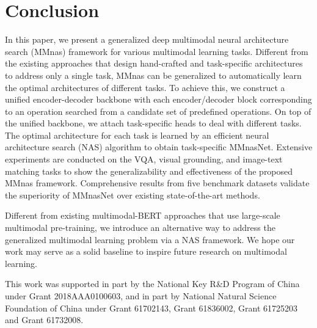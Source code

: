 \documentclass[sigconf]{acmart}
\begin{document}
\section{Conclusion}
In this paper, we present a generalized deep multimodal neural architecture search (MMnas) framework for various multimodal learning tasks. Different from the existing approaches that design hand-crafted and task-specific architectures to address only a single task, MMnas can be generalized to automatically learn the optimal architectures of different tasks. To achieve this,
we construct a unified encoder-decoder backbone with each encoder/decoder block corresponding to an operation searched from a candidate set of predefined operations. On top of the unified backbone, we attach task-specific heads to deal with different tasks. The optimal architecture for each task is learned by an efficient neural architecture search (NAS) algorithm to obtain task-specific MMnasNet. Extensive experiments are conducted on the VQA, visual grounding, and image-text matching tasks to show the generalizability and effectiveness of the proposed MMnas framework. Comprehensive results from five benchmark datasets validate the superiority of MMnasNet over existing state-of-the-art methods.

Different from existing multimodal-BERT approaches that use large-scale multimodal pre-training, we introduce an alternative way to address the generalized multimodal learning problem via a NAS framework. We hope our work may serve as a solid baseline to inspire future research on multimodal learning.

\begin{acks}
This work was supported in part by the National Key R\&D Program of China under Grant 2018AAA0100603, and in part by National Natural Science Foundation of China under Grant 61702143, Grant 61836002, Grant 61725203 and Grant 61732008.
\end{acks}


\end{document}
